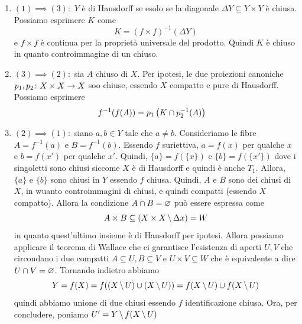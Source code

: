 \documentclass[a4paper]{article}
\begin{document}
\begin{snippetproof}{}
    \begin{enumerate}
        \item \((1) \implies (3):\) \(Y\) è di Hausdorff se esolo se la diagonale
        \(\Delta Y \subseteq Y \times Y\) è chiusa. Possiamo esprimere \(K\)
        come
        \[
            K = (f \times f)^{-1}(\Delta Y)
        \]
        e \(f \times f\) è continua per la proprietà universale del prodotto.
        Quindi \(K\) è chiuso in quanto controimmagine di un chiuso.
        \item \((3) \implies (2):\) sia \(A\) chiuso di \(X\).
        Per ipotesi, le due proiezioni canoniche \(p_1, p_2 \colon X \times X \to X\)
        soo chiuse, essendo \(X\) compatto e pure di Hausdorff.
        Possiamo esprimere
        \begin{align*}
            f^{-1}(f(A)) &= p_1\left(
                K \cap p_2^{-1}(A)
            \right)
        \end{align*}
        \item \((2) \implies (1):\)
        siano \(a,b \in Y\) tale che \(a \neq b\).
        Consideriamo le fibre \(A = f^{-1}(a)\) e \(B = f^{-1}(b)\).
        Essendo \(f\) suriettiva, \(a = f(x)\) per qualche \(x\)
        e \(b = f(x')\) per qualche \(x'\).
        Quindi, \(\{a\} = f(\{x\})\) e \(\{b\} = f(\{x'\})\)
        dove i singoletti sono chiusi siccome \(X\) è di Hausdorff e quindi è anche \(T_1\).
        Allora, \(\{a\}\) e \(\{b\}\) sono chiusi in \(Y\)
        essendo \(f\) chiusa.
        Quindi, \(A\) e \(B\) sono dei chiusi di \(X\), in wuanto controimmagini di chiusi,
        e quindi compatti (essendo \(X\) compatto).
        Allora la condizione \(A \cap B = \varnothing\) può essere espressa come
        \[
            A \times B \subseteq (X \times X \,\backslash\, \Delta x) = W
        \]
        in quanto quest'ultimo insieme è di Hausdorff per ipotesi.
        Allora possiamo applicare il teorema di Wallace che ci garantisce 
        l'esistenza di aperti \(U, V\) che circondano i due compatti
        \(A \subseteq U, B \subseteq V\) e \(U \times V \subseteq W\) che è equivalente a dire
        \(U \cap V = \varnothing\).
        Tornando indietro abbiamo
        \[
            Y = f(X) = f((X \,\backslash\, U) \cup (X \,\backslash\, U)) = f(X \,\backslash\, U) \cup f(X \,\backslash\, U)
        \]
        quindi abbiamo unione di due chiusi essendo \(f\) identificazione chiusa.
        Ora, per concludere, poniamo \(U' = Y \,\backslash\, f(X \,\backslash\, U)\)

\end{enumerate}
\end{snippetproof}
\end{document}
